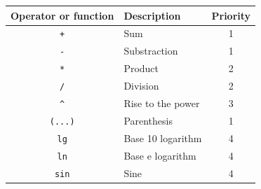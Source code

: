\begin{table}
\centering
\begin{tabular}{clc}
\hline
Operator or function& Description & Priority\\
\hline
\lstinline!+!       & Sum  & 1\\ 
\lstinline!-!       & Substraction& 1\\
\lstinline!*!       & Product & 2\\
\lstinline!/!       & Division & 2\\
\lstinline!^!       & Rise to the power& 3\\
\lstinline!(...)!   & Parenthesis& 1\\
\lstinline!lg!      & Base 10 logarithm& 4\\
\lstinline!ln!      & Base e logarithm & 4\\
\lstinline!sin!     & Sine& 4\\

\end{tabular}
\end{table}
